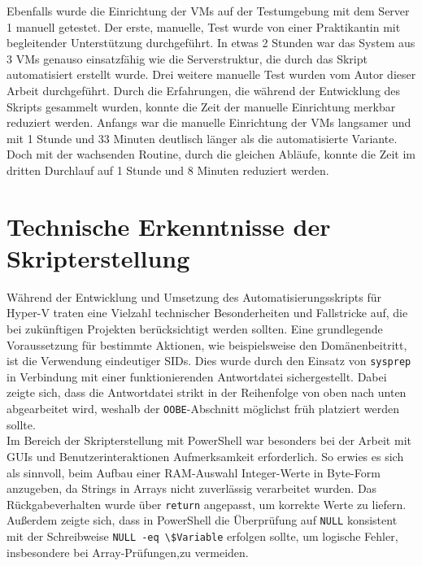 \documentclass[a4paper,12pt]{article}
\begin{document}
Ebenfalls wurde die Einrichtung der VMs auf der Testumgebung mit dem Server 1 manuell getestet. Der erste, manuelle, Test wurde von einer Praktikantin mit begleitender Unterstützung durchgeführt.
In etwas 2 Stunden war das System aus 3 VMs genauso einsatzfähig wie die Serverstruktur, die durch das Skript automatisiert erstellt wurde. Drei weitere manuelle Test wurden vom Autor dieser Arbeit durchgeführt.
Durch die Erfahrungen, die während der Entwicklung des Skripts gesammelt wurden, konnte die Zeit der manuelle Einrichtung merkbar reduziert werden.
Anfangs war die manuelle Einrichtung der VMs langsamer und mit 1 Stunde und 33 Minuten deutlisch länger als die automatisierte Variante.
Doch mit der wachsenden Routine, durch die gleichen Abläufe, konnte die Zeit im dritten Durchlauf auf 1 Stunde und 8 Minuten reduziert werden.\\

\section{Technische Erkenntnisse der Skripterstellung}

Während der Entwicklung und Umsetzung des Automatisierungsskripts für Hyper-V traten eine Vielzahl technischer Besonderheiten und Fallstricke auf, die bei zukünftigen Projekten berücksichtigt werden sollten. Eine grundlegende Voraussetzung für bestimmte Aktionen, wie beispielsweise den Domänenbeitritt, ist die Verwendung eindeutiger SIDs. Dies wurde durch den Einsatz von \lstinline|sysprep| in Verbindung mit einer funktionierenden Antwortdatei sichergestellt. Dabei zeigte sich, dass die Antwortdatei strikt in der Reihenfolge von oben nach unten abgearbeitet wird, weshalb der \lstinline|OOBE|-Abschnitt möglichst früh platziert werden sollte.\\  


Im Bereich der Skripterstellung mit PowerShell war besonders bei der Arbeit mit GUIs und Benutzerinteraktionen Aufmerksamkeit erforderlich. So erwies es sich als sinnvoll, beim Aufbau einer RAM-Auswahl Integer-Werte in Byte-Form anzugeben, da Strings in Arrays nicht zuverlässig verarbeitet wurden. Das Rückgabeverhalten wurde über \lstinline|return| angepasst, um korrekte Werte zu liefern. Außerdem zeigte sich, dass in PowerShell die Überprüfung auf \lstinline|NULL| konsistent mit der Schreibweise \lstinline|NULL -eq \$Variable| erfolgen sollte, um logische Fehler, insbesondere bei Array-Prüfungen,zu vermeiden. \\ 
\end{document}
